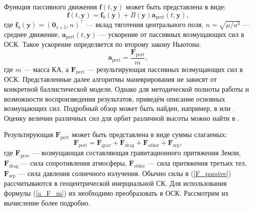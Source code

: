 Функция пассивного движения $\mathbf{f}(t, \mathbf{y})$ может быть представлена в виде: 
\begin{equation}
    \mathbf{f}(t, \mathbf{y}) = \mathbf{f}_0 (\mathbf{y}) + B(\mathbf{y}) \mathbf{a}_{\text{pert}}(t, \mathbf{y}),
\end{equation}
где $\mathbf{f}_0 (\mathbf{y}) = \left( \mathbf{0}_{1 \times 5}, n \right)^\top$ --- вклад тяготения центрального поля, $n = \sqrt{\mu / a^3}$ --- среднее движение, $\mathbf{a}_{\text{pert}}(t, \mathbf{y})$ --- ускорение от пассивных возмущающих сил в ОСК. Такое ускорение определяется по второму закону Ньютона:
\begin{equation}
    \mathbf{a}_{\text{pert}} = \frac{\mathbf{F}_{\text{pert}}}{m},
\label{a_F_m}
\end{equation}
где $m$ --- масса КА, а $\mathbf{F}_{\text{pert}}$ --- результирующая пассивных возмущающих сил в ОСК. Представленные далее алгоритмы маневрирования не зависят от конкретной баллистической модели. Однако для методической полноты работы и возможности воспроизведения результатов, приведём описание основных возмущающих сил. Подробный обзор может быть найден, например, в \cite{vallado2001fundamentals} или \cite{авдюшев2015численное}. Оценку величин различных сил для орбит различной высоты можно найти в \cite{марков2016анализ}. 

Результирующая $\mathbf{F}_{\text{pert}}$ может быть представлена в виде суммы слагаемых:
\begin{equation}
    \mathbf{F}_{\text{pert}} = \mathbf{F}_{\text{grav}} + \mathbf{F}_{\text{drag}} + \mathbf{F}_{\text{other}} + \mathbf{F}_{\text{srp}},
\label{F_passive}
\end{equation}
где $\mathbf{F}_{\text{grav}}$ --- возмущающая составляющая гравитационного притяжения Земли, $\mathbf{F}_{\text{drag}}$ --- сила сопротивления атмосферы, $\mathbf{F}_{\text{other}}$ --- сила притяжения третьих тел, $\mathbf{F}_{\text{srp}}$ --- сила давления солнечного излучения. Обычно силы в (\ref{F_passive}) рассчитываются в геоцентрической инерциальной СК. Для использования формулы (\ref{a_F_m}) их необходимо преобразовать в ОСК. Рассмотрим их вычисление более подробно.

